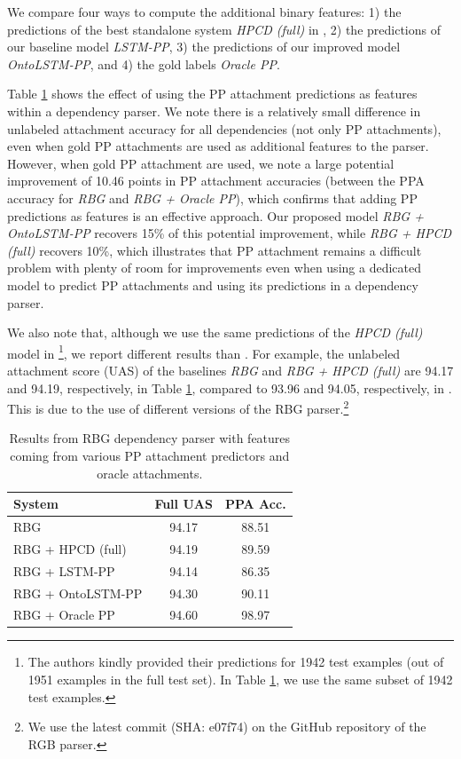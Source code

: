 We compare four ways to compute the additional binary features: 1) the predictions of the best standalone system \textit{HPCD (full)} in \cite{belinkov2014exploring}, 2) the predictions of our baseline model \textit{LSTM-PP}, 3) the predictions of our improved model \textit{OntoLSTM-PP}, and 4) the gold labels \textit{Oracle PP}. 

Table \ref{tab:ontolstm_parser_ppa_results} shows the effect of using the PP attachment predictions as features within a dependency parser. 
We note there is a relatively small difference in unlabeled attachment accuracy for all dependencies (not only PP attachments), even when gold PP attachments are used as additional features to the parser.
However, when gold PP attachment are used, we note a large potential improvement of 10.46 points in PP attachment accuracies (between the PPA accuracy for \textit{RBG} and \textit{RBG + Oracle PP}), which confirms that adding PP predictions as features is an effective approach. 
Our proposed model \textit{RBG + OntoLSTM-PP} recovers 15\% of this potential improvement, while \textit{RBG + HPCD (full)} recovers 10\%, which illustrates that PP attachment remains a difficult problem with plenty of room for improvements even when using a dedicated model to predict PP attachments and using its predictions in a dependency parser.

We also note that, although we use the same predictions of the \textit{HPCD (full)} model in  \cite{belinkov2014exploring}\footnote{The authors kindly provided their predictions for 1942 test examples (out of 1951 examples in the full test set). In Table \ref{tab:ontolstm_parser_ppa_results}, we use the same subset of 1942 test examples.}, we report different results than  \cite{belinkov2014exploring}.
For example, the unlabeled attachment score (UAS) of the baselines \textit{RBG} and \textit{RBG + HPCD (full)} are 94.17 and 94.19, respectively, in Table \ref{tab:ontolstm_parser_ppa_results}, compared to 93.96 and 94.05, respectively, in \cite{belinkov2014exploring}.
This is due to the use of different versions of the RBG parser.\footnote{We use the latest commit (SHA: e07f74) on the GitHub repository of the RGB parser.}

\begin{table}
    \centering
    \begin{tabular}{|l|c|c|}
    \hline
    \textbf{System} & \textbf{Full UAS} & \textbf{PPA Acc.}\\
    \hline
    RBG               & 94.17 & 88.51 \\
    RBG + HPCD (full) & 94.19 & 89.59 \\
    RBG + LSTM-PP  & 94.14 & 86.35 \\
    RBG + OntoLSTM-PP & 94.30 & 90.11 \\
    RBG + Oracle PP & 94.60 & 98.97 \\
    \hline
    \end{tabular}
    \caption{Results from RBG dependency parser with features coming from various PP attachment predictors and oracle attachments. }
    \label{tab:ontolstm_parser_ppa_results}
\end{table}


